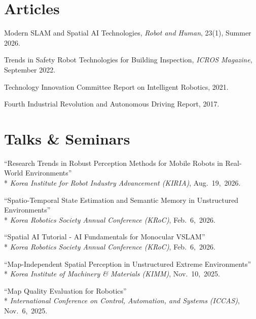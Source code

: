 \documentclass[margin]{res}
\begin{document}
\begin{resume}
		\section{Articles}
		\par Modern SLAM and Spatial AI Technologies, \textit{Robot and Human}, 23(1), Summer 2026.

		\par Trends in Safety Robot Technologies for Building Inspection, \textit{ICROS Magazine}, September 2022.

		\par Technology Innovation Committee Report on Intelligent Robotics, 2021.

		\par Fourth Industrial Revolution and Autonomous Driving Report, 2017.

		\section{Talks \& Seminars}
		\begingroup\raggedright
		\par ``Research Trends in Robust Perception Methods for Mobile Robots in Real-World Environments''\\*
		\textit{Korea Institute for Robot Industry Advancement (KIRIA)}, Aug.~19,~2026.

		\par ``Spatio-Temporal State Estimation and Semantic Memory in Unstructured Environments''\\*
		\textit{Korea Robotics Society Annual Conference (KRoC)}, Feb.~6,~2026.

		\par ``Spatial AI Tutorial - AI Fundamentals for Monocular VSLAM''\\*
		\textit{Korea Robotics Society Annual Conference (KRoC)}, Feb.~6,~2026.

		\par ``Map-Independent Spatial Perception in Unstructured Extreme Environments''\\*
		\textit{Korea Institute of Machinery \& Materials (KIMM)}, Nov.~10,~2025.

		\par ``Map Quality Evaluation for Robotics''\\*
		\textit{International Conference on Control, Automation, and Systems (ICCAS)}, Nov.~6,~2025.


\end{resume}
\end{document}

